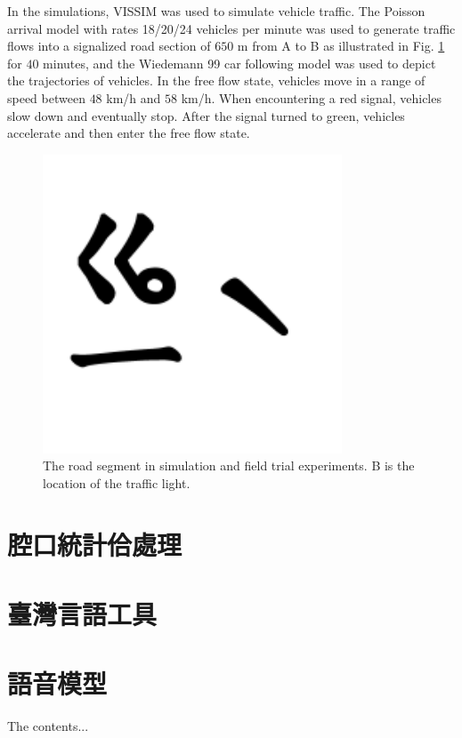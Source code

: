 \documentclass[final,oneside,onecolumn,12pt,a4paper]{book}%
\begin{document}
In the simulations, VISSIM \cite{Mosseri2004VISSIM} was used to simulate
vehicle traffic. The Poisson arrival model with rates 18/20/24 vehicles per
minute was used to generate traffic flows into a signalized road section of
$650$ m from A to B as illustrated in Fig. \ref{fig:f_map} for $40$ minutes,
and the Wiedemann 99 car following model \cite{Mosseri2004VISSIM} was used to
depict the trajectories of vehicles. In the free flow state, vehicles move in
a range of speed between $48$ km/h and $58$ km/h. When encountering a red
signal, vehicles slow down and eventually stop. After the signal turned to
green, vehicles accelerate and then enter the free flow state.
\begin{figure}[pth]
\centerline{\includegraphics[angle=0, width=3.5in,keepaspectratio]
{圖/⿳⿳ㆣㄧˋ}} \hfill\caption{The road segment in simulation and field
trial experiments. B is the location of the traffic light.}%
\label{fig:f_map}%
\end{figure}




\begin{appendices}
\chapter{腔口統計佮處理}
\label{章：腔口統計佮處理}
\chapter{臺灣言語工具}
\chapter{語音模型}
The contents...
\end{appendices}
\end{document}
